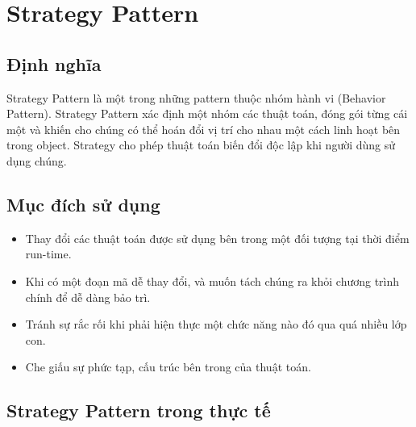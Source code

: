 \chapter{Strategy Pattern}

\section{Định nghĩa}
Strategy Pattern là một trong những pattern thuộc nhóm hành vi (Behavior Pattern). Strategy Pattern xác định một nhóm các thuật toán, đóng gói từng cái một và khiến cho chúng có thể hoán đổi vị trí cho nhau một cách linh hoạt bên trong object. Strategy cho phép thuật toán biến đổi độc lập khi người dùng sử dụng chúng.

\section{Mục đích sử dụng}
\begin{itemize}
\item Thay đổi các thuật toán được sử dụng bên trong một đối tượng tại thời điểm run-time.
\item Khi có một đoạn mã dễ thay đổi, và muốn tách chúng ra khỏi chương trình chính để dễ dàng bảo trì.
\item Tránh sự rắc rối khi phải hiện thực một chức năng nào đó qua quá nhiều lớp con.
\item Che giấu sự phức tạp, cấu trúc bên trong của thuật toán.
\end{itemize}

\section{Strategy Pattern trong thực tế}

